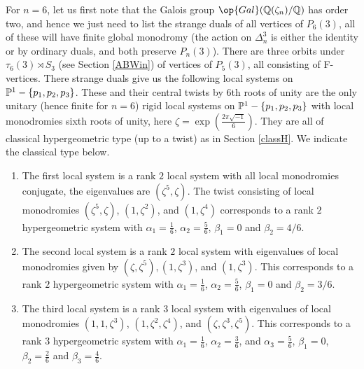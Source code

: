 For $n=6$, let us first note that the Galois group $\op{Gal}(\Bbb{Q}(\zeta_n)/\Bbb{Q})$ has order two, and hence we just need to list the strange duals of all vertices of $P_6(3)$, all of these will have finite global monodromy (the action on $\Delta_n^3$ is either the identity or by ordinary duals, and both preserve $P_n(3)$). There are three orbits under $\tau_6(3)\rtimes S_3$ (see Section \ref{ABWin})  of vertices of $P_5(3)$,  all consisting of F-vertices. There strange duals give us the following local systems
on $\Bbb{P}^{1}-\{p_1,p_2,p_3\}$. These and their central twists by $6$th roots of unity are the only unitary (hence finite for $n=6$) rigid local systems on $\Bbb{P}^{1}-\{p_1,p_2,p_3\}$ with local monodromies  sixth roots of unity, here $\zeta=\exp(\frac{2\pi\sqrt{-1}}{6})$. They are all of classical
hypergeometric type (up to a twist)  as in Section \ref{classH}. We indicate the classical type below.
\begin{enumerate}
\item The first local system is a rank $2$ local system with  all local monodromies conjugate, the eigenvalues are $(\zeta^5,\zeta)$. The twist consisting of local monodromies $(\zeta^5,\zeta)$, $(1,\zeta^2)$, and $ (1,\zeta^4)$ corresponds to a rank $2$ hypergeometric system with $\alpha_1=\frac{1}{6}$, $\alpha_2=\frac{5}{6}$, $\beta_1=0$ and  $\beta_2=4/6$.
\item The second local system is a rank $2$ local system with  eigenvalues of local monodromies  given by
$(\zeta,\zeta^5), (1,\zeta^3)$, and $(1,\zeta^3)$.  This corresponds to a rank $2$ hypergeometric system with $\alpha_1=\frac{1}{6}$, $\alpha_2=\frac{5}{6}$, $\beta_1=0$ and  $\beta_2=3/6$.
\item The third local system is a rank $3$ local system with eigenvalues of local monodromies $(1,1,\zeta^3)$, $(1,\zeta^2,\zeta^4)$, and $(\zeta,\zeta^3,\zeta^5)$. This  corresponds to a rank $3$ hypergeometric system with $\alpha_1=\frac{1}{6}$, $\alpha_2=\frac{3}{6}$,  and $\alpha_3= \frac{5}{6}$, $\beta_1=0$,  $\beta_2=\frac{2}{6}$ and $\beta_3=\frac{4}{6}$.
\end{enumerate}

